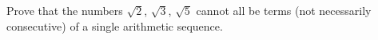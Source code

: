 Prove that the numbers $\sqrt2$, $\sqrt3$, $\sqrt5$ cannot all be terms (not necessarily consecutive) of a single arithmetic sequence.
